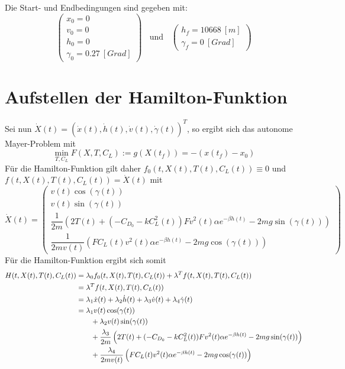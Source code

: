 Die Start- und Endbedingungen sind gegeben mit:
\begin{equation}
\begin{pmatrix}
x_0 = 0 \\ 
v_0 = 0 \\ 
h_0 = 0 \\ 
\gamma_0 = 0.27 \ [Grad]
\end{pmatrix} \ \ \ \ \text{und} \ \ \ \ \begin{pmatrix}
h_f = 10668 \ [m] \\ 
\gamma_f = 0 \ [Grad]
\end{pmatrix}  
\end{equation}









\section{Aufstellen der Hamilton-Funktion}
Sei nun $\dot{X}(t) = (\dot{x}(t), \dot{h}(t),\dot{v}(t),\dot{\gamma}(t))^T$, so ergibt sich das autonome Mayer-Problem mit \[\min_{T,C_L} F(X,T,C_L) := g(X(t_f)) =  -(x(t_f) - x_0)\] Für die Hamilton-Funktion gilt daher $f_0(t,X(t),T(t),C_L(t)) \equiv 0$ und $f(t,X(t),T(t),C_L(t)) = \dot{X}(t)$ mit
\[\dot{X}(t) = \begin{pmatrix}
v(t) \cos(\gamma(t)) \\ 
v(t) \sin(\gamma(t)) \\ 
\dfrac{1}{2m} \left(2T(t) + (-C_{D_0}-k C_L^2(t)) F  v^2(t) \alpha e^{-\beta h(t)} - 2 m g \sin(\gamma(t)) \right) \\ 
\dfrac{1}{2mv(t)} \left(F C_L(t)v^2(t) \alpha e^{-\beta h(t)} - 2 m g \cos(\gamma(t)) \right)
\end{pmatrix} \]
Für die Hamilton-Funktion ergibt sich somit 
\[\begin{split}
H(t,X(t),T(t),C_L(t)) &= \lambda_0 f_0(t,X(t),T(t),C_L(t)) + \lambda^T f(t,X(t),T(t),C_L(t)) \\\
&= \lambda^T f(t,X(t),T(t),C_L(t)) \\\
&= \lambda_1 \dot{x}(t) + \lambda_2 \dot{h}(t) + \lambda_3 \dot{v}(t) + \lambda_4 \dot{\gamma}(t) \\\
&= \lambda_1 v(t) \cos(\gamma(t)) \\\
&\hspace{7mm} + \lambda_2 v(t) \sin(\gamma(t)) \\\
&\hspace{7mm} + \dfrac{\lambda_3}{2m} \left(2T(t) + (-C_{D_0}-k C_L^2(t)) F  v^2(t) \alpha e^{-\beta h(t)} - 2 m g \sin(\gamma(t)) \right) \\\
&\hspace{7mm} + \dfrac{\lambda_4}{2mv(t)} \left(F C_L(t)v^2(t) \alpha e^{-\beta h(t)} - 2 m g \cos(\gamma(t)) \right) 
\end{split}\]




